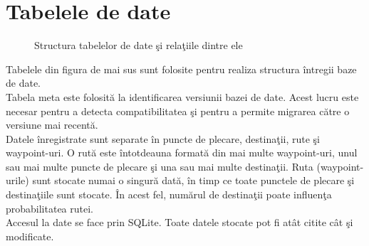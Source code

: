\label{cap4}


\label{Chapter4} %

\thispagestyle{fancy}

\section{Tabelele de date}


\begin{figure}[h!]
  \centering
  \caption{Structura tabelelor de date şi relaţiile dintre ele}
\end{figure}

Tabelele din figura de mai sus sunt folosite pentru realiza structura întregii baze de date.
\vspace{6pt}
\\Tabela meta este folosită la identificarea versiunii bazei de date. Acest lucru este necesar pentru a detecta compatibilitatea şi pentru a permite migrarea către o versiune mai recentă. 
\vspace{6pt}
\\Datele înregistrate sunt separate în puncte de plecare, destinaţii, rute şi waypoint-uri. O rută este întotdeauna formată din mai multe waypoint-uri, unul sau mai multe puncte de plecare şi una sau mai multe destinaţii. Ruta (waypoint-urile) sunt stocate numai o singură dată, în timp ce toate punctele de plecare şi destinaţiile sunt stocate. În acest fel, numărul de destinaţii poate influenţa probabilitatea rutei.
\vspace{6pt}
\\Accesul la date se face prin SQLite. Toate datele stocate pot fi atât citite cât şi modificate.


